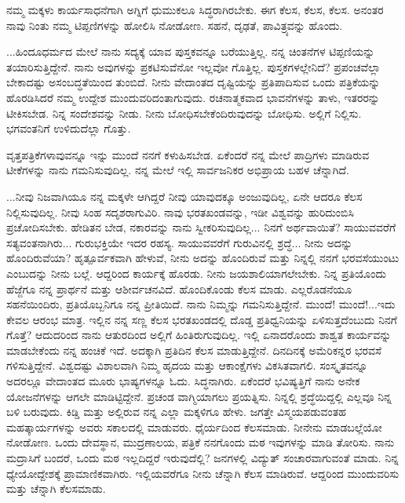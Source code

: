 ನಮ್ಮ ಮಕ್ಕಳು ಕಾರ್ಯಸಾಧನೆಗಾಗಿ ಅಗ್ನಿಗೆ ಧುಮುಕಲೂ ಸಿದ್ಧರಾಗಿರಬೇಕು. ಈಗ ಕೆಲಸ, ಕೆಲಸ, ಕೆಲಸ. ಅನಂತರ ನಾವು ನಿಂತು ನಮ್ಮ ಟಿಪ್ಪಣಿಗಳನ್ನು ಹೋಲಿಸಿ ನೋಡೋಣ. ಸಹನೆ, ದೃಢತೆ, ಪಾವಿತ್ರ್ಯವನ್ನು ಹೊಂದು.

...ಹಿಂದೂಧರ್ಮದ ಮೇಲೆ ನಾನು ಸದ್ಯಕ್ಕೆ ಯಾವ ಪುಸ್ತಕವನ್ನೂ ಬರೆಯುತ್ತಿಲ್ಲ. ನನ್ನ ಚಿಂತನೆಗಳ ಟಿಪ್ಪಣಿಯನ್ನು ತಯಾರಿಸುತ್ತಿದ್ದೇನೆ. ನಾನು ಅವುಗಳನ್ನು ಪ್ರಕಟಿಸುವೆನೋ ಇಲ್ಲವೋ ಗೊತ್ತಿಲ್ಲ. ಪುಸ್ತಕಗಳಲ್ಲೇನಿದೆ? ಪ್ರಪಂಚವೆಲ್ಲಾ ಬೇಕಾದಷ್ಟು ಅಸಂಬದ್ಧತೆಯಿಂದ ತುಂಬಿದೆ. ನೀನು ವೇದಾಂತದ ದೃಷ್ಟಿಯನ್ನು ಪ್ರತಿಪಾದಿಸುವ ಒಂದು ಪತ್ರಿಕೆಯನ್ನು ಹೊರಡಿಸಿದರೆ ನಮ್ಮ ಉದ್ದೇಶ ಮುಂದುವರಿದಂತಾಗುವುದು. ರಚನಾತ್ಮಕವಾದ ಭಾವನೆಗಳನ್ನು ತಾಳು, ಇತರರನ್ನು ಟೀಕಿಸಬೇಡ. ನಿನ್ನ ಸಂದೇಶವನ್ನು ನೀಡು. ನೀನು ಬೋಧಿಸಬೇಕೆಂದಿರುವುದನ್ನು ಬೋಧಿಸು. ಅಲ್ಲಿಗೆ ನಿಲ್ಲಿಸು. ಭಗವಂತನಿಗೆ ಉಳಿದುದೆಲ್ಲಾ ಗೊತ್ತು.

ವೃತ್ತಪತ್ರಿಕೆಗಳಾವುವನ್ನೂ ಇನ್ನು ಮುಂದೆ ನನಗೆ ಕಳುಹಿಸಬೇಡ. ಏಕೆಂದರೆ ನನ್ನ ಮೇಲೆ ಪಾದ್ರಿಗಳು ಮಾಡಿರುವ ಟೀಕೆಗಳನ್ನು ನಾನು ಗಮನಿಸುವುದಿಲ್ಲ. ನನ್ನ ಮೇಲೆ ಇಲ್ಲಿ ಸಾರ್ವಜನಿಕರ ಅಭಿಪ್ರಾಯ ಬಹಳ ಚೆನ್ನಾಗಿದೆ.

...ನೀವು ನಿಜವಾಗಿಯೂ ನನ್ನ ಮಕ್ಕಳೇ ಆಗಿದ್ದರೆ ನೀವು ಯಾವುದಕ್ಕೂ ಅಂಜುವುದಿಲ್ಲ, ಏನೇ ಆದರೂ ಕೆಲಸ ನಿಲ್ಲಿಸುವುದಿಲ್ಲ. ನೀವು ಸಿಂಹ ಸದೃಶರಾಗುವಿರಿ. ನಾವು ಭರತಖಂಡವನ್ನು, ಇಡೀ ವಿಶ್ವವನ್ನು ಹುರಿದುಂಬಿಸಿ ಪ್ರಚೋದಿಸಬೇಕು. ಹೇಡಿತನ ಬೇಡ, ನಕಾರವನ್ನು ನಾನು ಸ್ವೀಕರಿಸುವುದಿಲ್ಲ... ನಿನಗೆ ಅರ್ಥವಾಯಿತೆ? ಸಾಯುವವರೆಗೆ ಸತ್ಯವಂತನಾಗಿರು... ಗುರುಭಕ್ತಿಯೇ ಇದರ ರಹಸ್ಯ. ಸಾಯುವವರೆಗೆ ಗುರುವಿನಲ್ಲಿ ಶ್ರದ್ಧೆ... ನೀನು ಅದನ್ನು ಹೊಂದಿರುವೆಯಾ? ಹೃತ್ಪೂರ್ವಕವಾಗಿ ಹೇಳುವೆ, ನೀನು ಅದನ್ನು ಹೊಂದಿರುವೆ ಮತ್ತು ನಿನ್ನಲ್ಲಿ ನನಗೆ ಭರವಸೆಯುಂಟು ಎಂಬುದನ್ನು ನೀನು ಬಲ್ಲೆ. ಆದ್ದರಿಂದ ಕಾರ್ಯಕ್ಕೆ ಹೊರಡು. ನೀನು ಜಯಶಾಲಿಯಾಗಲೇಬೇಕು. ನಿನ್ನ ಪ್ರತಿಯೊಂದು ಹೆಜ್ಜೆಗೂ ನನ್ನ ಪ್ರಾರ್ಥನೆ ಮತ್ತು ಆಶೀರ್ವಚನವಿದೆ. ಹೊಂದಿಕೊಂಡು ಕೆಲಸ ಮಾಡು. ಎಲ್ಲರೊಡನೆಯೂ ಸಹನೆಯಿಂದಿರು, ಪ್ರತಿಯೊಬ್ಬನಿಗೂ ನನ್ನ ಪ್ರೀತಿಯಿದೆ. ನಾನು ನಿಮ್ಮನ್ನು ಗಮನಿಸುತ್ತಿದ್ದೇನೆ. ಮುಂದೆ! ಮುಂದೆ!...ಇದು ಕೇವಲ ಆರಂಭ ಮಾತ್ರ. ಇಲ್ಲಿನ ನನ್ನ ಸಣ್ಣ ಕೆಲಸ ಭರತಖಂಡದಲ್ಲಿ ದೊಡ್ಡ ಪ್ರತಿಧ್ವನಿಯನ್ನು ಏಳಿಸುತ್ತದೆಂಬುದು ನಿನಗೆ ಗೊತ್ತೆ? ಆದುದರಿಂದ ನಾನು ಆತುರದಿಂದ ಅಲ್ಲಿಗೆ ಹಿಂತಿರುಗುವುದಿಲ್ಲ. ಇಲ್ಲಿ ಏನಾದರೊಂದು ಶಾಶ್ವತ ಕಾರ್ಯವನ್ನು ಮಾಡಬೇಕೆಂದು ನನ್ನ ಹಂಚಿಕೆ ಇದೆ. ಅದಕ್ಕಾಗಿ ಪ್ರತಿದಿನ ಕೆಲಸ ಮಾಡುತ್ತಿದ್ದೇನೆ. ದಿನದಿನಕ್ಕೆ ಅಮೆರಿಕನ್ನರ ಭರವಸೆ ಗಳಿಸುತ್ತಿದ್ದೇನೆ. ವಿಶ್ವದಷ್ಟು ವಿಶಾಲವಾಗಿ ನಿಮ್ಮ ಹೃದಯ ಮತ್ತು ಆಕಾಂಕ್ಷೆಗಳು ವಿಕಸಿತವಾಗಲಿ. ಸಂಸ್ಕೃತವನ್ನೂ ಅದರಲ್ಲೂ ವೇದಾಂತದ ಮೂರು ಭಾಷ್ಯಗಳನ್ನೂ ಓದು. ಸಿದ್ಧನಾಗಿರು. ಏಕೆಂದರೆ ಭವಿಷ್ಯತ್ತಿಗೆ ನಾನು ಅನೇಕ ಯೋಜನೆಗಳನ್ನು ಆಗಲೇ ಮಾಡಿಟ್ಟಿದ್ದೇನೆ. ಪ್ರಚಂಡ ವಾಗ್ಮಿಯಾಗಲು ಪ್ರಯತ್ನಿಸು. ನಿನ್ನಲ್ಲಿ ಶ್ರದ್ಧೆಯಿದ್ದಲ್ಲಿ ಎಲ್ಲವೂ ನಿನ್ನ ಬಳಿ ಬರುವುದು. ಕಿಡ್ಡಿ ಮತ್ತು ಅಲ್ಲಿರುವ ನನ್ನ ಎಲ್ಲಾ ಮಕ್ಕಳಿಗೂ ಹೇಳು. ಜಗತ್ತೇ ವಿಸ್ಮಯಪಡುವಂತಹ ಮಹತ್ಕಾರ್ಯಗಳನ್ನು ಅವರು ಸಕಾಲದಲ್ಲಿ ಮಾಡುವರು. ಧೈರ್ಯದಿಂದ ಕೆಲಸಮಾಡು. ನೀನೇನು ಮಾಡಬಲ್ಲೆಯೋ ನೋಡೋಣ. ಒಂದು ದೇವಸ್ಥಾನ, ಮುದ್ರಣಾಲಯ, ಪತ್ರಿಕೆ ನನಗೊಂದು ಮಠ\enginline{-} ಇವುಗಳನ್ನು ಮಾಡಿ ತೋರಿಸು. ನಾನು ಮದ್ರಾಸಿಗೆ ಬಂದರೆ, ಒಂದು ಮಠ ಇಲ್ಲದಿದ್ದರೆ ಇರುವುದೆಲ್ಲಿ? ಜನಗಳಲ್ಲಿ ವಿದ್ಯುತ್‌ ಸಂಚಾರವಾಗುವಂತೆ ಮಾಡು. ನಿನ್ನ ಧ್ಯೇಯೋದ್ದೇಶಕ್ಕೆ ಪ್ರಾಮಾಣಿಕವಾಗಿರು. ಇಲ್ಲಿಯವರೆಗೂ ನೀನು ಚೆನ್ನಾಗಿ ಕೆಲಸ ಮಾಡಿರುವೆ. ಆದ್ದರಿಂದ ಮುಂದುವರಿಸು ಮತ್ತು ಚೆನ್ನಾಗಿ ಕೆಲಸಮಾಡು.

